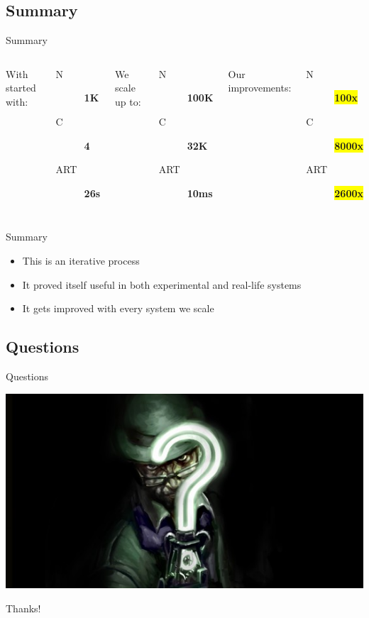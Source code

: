 \documentclass[utf8]{beamer}
\begin{document}
\subsection{Summary}
\begin{frame}{Summary}
	\begin{columns}
			With started with:
			\begin{description}
				\item[N] \textbf{\Large 1K}
				\item[C] \textbf{\Large 4}
				\item[ART] \textbf{\Large 26s}
			\end{description}
			We scale up to:
			\begin{description}
				\item[N] \textbf{\Large 100K}
				\item[C] \textbf{\Large 32K}
				\item[ART] \textbf{\Large 10ms}
			\end{description}
			Our improvements:
			\begin{description}
				\item[N] \textbf{\colorbox{yellow}{100x}}
				\item[C] \textbf{\colorbox{yellow}{8000x}}
				\item[ART] \textbf{\colorbox{yellow}{2600x}}
			\end{description}
	\end{columns}
\end{frame}
\begin{frame}{Summary}
	\begin{itemize}
		\item<+-> This is an \alert{iterative} process
		\item<+-> It proved itself useful in both experimental and real-life systems
		\item<+-> It gets improved with every system we scale
	\end{itemize}
\end{frame}
\subsection{Questions}
\begin{frame}{Questions}
	\begin{center}
		\includegraphics[width=\textwidth]{img/theriddler.jpg}
	\end{center}
\end{frame}

\appendix

\begin{frame}
	\begin{center}
		{\Huge Thanks!}
	\end{center}
\end{frame}
\end{document}
